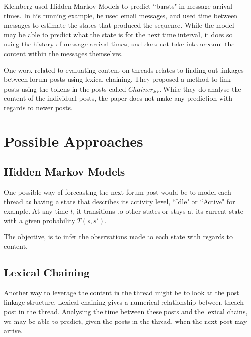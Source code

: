 \documentclass{article}
\begin{document}
Kleinberg \cite{Kleinberg2002} used Hidden Markov Models to predict ``bursts" in message arrival times. In his running example, he used email messages, and used time between messages to estimate the states that produced the sequence. While the model may be able to predict what the state is for the next time interval, it does so using the history of message arrival times, and does not take into account the content within the messages themselves.

One work related to evaluating content on threads relates to finding out linkages between forum posts using lexical chaining. They proposed a method to link posts using the tokens in the posts called $Chainer_{SV}$. While they do analyse the content of the individual posts, the paper does not make any prediction with regards to newer posts.



\section{Possible Approaches}

\subsection{Hidden Markov Models}
One possible way of forecasting the next forum post would be to model each thread as having a state that describes its activity level, ``Idle" or ``Active" for example. At any time $t$, it transitions to other states or stays at its current state with a given probability $T(s,s')$.

The objective, is to infer the observations made to each state with regards to content.


\subsection{Lexical Chaining}
Another way to leverage the content in the thread might be to look at the post linkage structure. Lexical chaining gives a numerical relationship between theach post in the thread. Analysing the time between these posts and the lexical chains, we may be able to predict, given the posts in the thread, when the next post may arrive.
\end{document}
